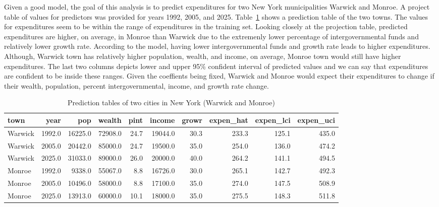 \documentclass[11pt]{article}\usepackage[]{graphicx}\usepackage[]{color}
\begin{document}
\noindent Given a good model, the goal of this analysis is to predict expenditures for two New York municipalities Warwick and Monroe. A project table of values for predictors was provided for years 1992, 2005, and 2025. Table~\ref{pred_tab} shows a prediction table of the two towns. The values for expenditures seem to be within the range of expenditures in the training set. Looking closely at the projection table, predicted expenditures are higher, on average, in Monroe than Warwick due to the extremenly lower percentage of intergovernmental funds and relatively lower growth rate. According to the model, having lower intergovernmental funds and growth rate leads to higher expenditures. Although, Warwick town has relatively higher population, wealth, and income, on average, Monroe town would still have higher expenditures. The last two columns depicts lower and upper 95\% confident interval of predicted values and we can say that expenditures are confident to be inside these ranges. Given the coeffients being fixed, Warwick and Monroe would expect their expenditures to change if their wealth, population, percent intergovernmental, income, and growth rate change.    

\begin{center}
\begin{table}[ht]
\centering
\begin{tabular}{lrrrrrrrrr}
  \hline
town & year & pop & wealth & pint & income & growr & expen\_hat & expen\_lci & expen\_uci \\ 
  \hline
Warwick & 1992.0 & 16225.0 & 72908.0 & 24.7 & 19044.0 & 30.3 & 233.3 & 125.1 & 435.0 \\ 
  Warwick & 2005.0 & 20442.0 & 85000.0 & 24.7 & 19500.0 & 35.0 & 254.0 & 136.0 & 474.2 \\ 
  Warwick & 2025.0 & 31033.0 & 89000.0 & 26.0 & 20000.0 & 40.0 & 264.2 & 141.1 & 494.5 \\ 
  Monroe & 1992.0 & 9338.0 & 55067.0 & 8.8 & 16726.0 & 30.0 & 265.1 & 142.7 & 492.3 \\ 
  Monroe & 2005.0 & 10496.0 & 58000.0 & 8.8 & 17100.0 & 35.0 & 274.0 & 147.5 & 508.9 \\ 
  Monroe & 2025.0 & 13913.0 & 60000.0 & 10.1 & 18000.0 & 35.0 & 275.5 & 148.3 & 511.8 \\ 
   \hline
\end{tabular}
\caption{Prediction tables of two cities in New York (Warwick and Monroe)} 
\label{pred_tab}
\end{table}

\end{center}
\end{document}
